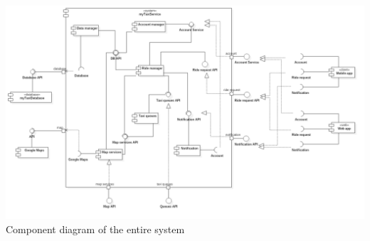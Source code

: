 \begin{center}
	\includegraphics[width=\textwidth]{diagrams/component_view.png}
	Component diagram of the entire system
\end{center}